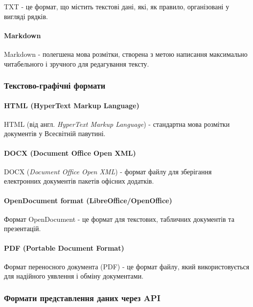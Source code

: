 TXT - це формат, що містить текстові дані, які, як правило, організовані у вигляді рядків.

\paragraph{Markdown}

Markdown - полегшена мова розмітки, створена з метою написання максимально читабельного і зручного для редагування тексту.

\subsubsection{Текстово-графічні формати}

\paragraph{HTML (HyperText Markup Language)}

HTML (від англ. \textit{HyperText Markup Language}) - стандартна мова розмітки документів у Всесвітній павутині.

\paragraph{DOCX (Document Office Open XML)}

DOCX (\textit{Document Office Open XML}) - формат файлу для зберігання електронних документів пакетів офісних додатків.

\paragraph{OpenDocument format (LibreOffice/OpenOffice)}

Формат OpenDocument - це формат для текстових, табличних документів та презентацій.

\paragraph{PDF (Portable Document Format)}

Формат переносного документа (PDF) - це формат файлу, який використовується для надійного уявлення і обміну документами.

\subsubsection{Формати представлення даних через API}

